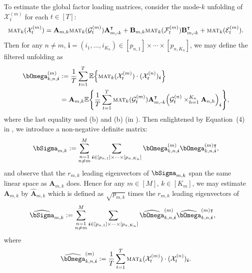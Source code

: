 \documentclass[aos]{imsart}
\theoremstyle{plain}
\theoremstyle{definition}
\def\mat{\textnormal{\textsc{mat}}}
\def\wh#1{\widehat{#1}}
\def\E{\mathbb{E}}
\def\cE{\mathcal{E}}
\def\cF{\mathcal{F}}
\def\cG{\mathcal{G}} \def\cH{\boldsymbol{\mathcal{H}}} \def\cI{\mathcal{I}}
\def\cX{\mathcal{X}}
\def\bi{\boldsymbol{i}}
\def\bA{\mathbf{A}}
\def\bB{\mathbf{B}}
\def\trans{\intercal}
\begin{document}
To estimate the global factor loading matrices, consider the mode-$k$ unfolding of $\cX_t^{(m)}$ for each $t\in[T]$:
\begin{equation}
\label{eqn: unfold_Xt}
\mat_k(\cX_t^{(m)}) = \bA_{m,k} \mat_k(\cG_t^{(m)}) \bA_{m,\text{-}k}^\trans + \bB_{m,k} \mat_k(\cF_t^{(m)}) \bB_{m,\text{-}k}^\trans + \mat_k(\cE_t^{(m)}) .
\end{equation}
Then for any $n\neq m$, $\bi=(i_1,\ldots,i_{K_n}) \in [p_{n,1}] \times \cdots \times[p_{n,K_n}]$, we may define the filtered unfolding as
\begin{align*}
    \bOmega_{k,n,\bi}^{(m)} &:= \frac{1}{T} \sum_{t=1}^T \E\Big\{ \mat_k(\cX_t^{(m)}) \cdot (\cX_t^{(n)})_{\bi} \Big\} \\
    &= \bA_{m,k} \E\Bigg\{ \frac{1}{T} \sum_{t=1}^T \mat_k(\cG_t^{(m)}) \bA_{m,\text{-}k}^\trans \Big( \cG_t^{(n)} \times_{h=1}^{K_n} \bA_{n,h} \Big)_{\bi} \Bigg\} ,
\end{align*}
where the last equality used (b) and (b) (in ). Then enlightened by Equation~(4) in \cite{Lametal2011}, we introduce a non-negative definite matrix:
\begin{equation*}
\begin{split}
    \bSigma_{m,k} := \sum_{\substack{n=1\\ n\neq m}}^M \sum_{\bi \in [p_{n,1}] \times \cdots \times[p_{n,K_n}]} \bOmega_{k,n,\bi}^{(m)} \bOmega_{k,n,\bi}^{(m) \trans} ,
\end{split}
\end{equation*}
and observe that the $r_{m,k}$ leading eigenvectors of $\bSigma_{m,k}$ span the same linear space as $\bA_{m,k}$ does. Hence for any $m\in[M]$, $k\in[K_m]$, we may estimate $\bA_{m,k}$ by $\wh{\bA}_{m,k}$ which is defined as $\sqrt{p_{m,k}}$ times the $r_{m,k}$ leading eigenvectors of
\begin{equation}
\label{eqn: def_hat_Sigma_mk}
\begin{split}
    \wh\bSigma_{m,k} &:= \sum_{\substack{n=1\\ n\neq m}}^M \sum_{\bi \in [p_{n,1}] \times \cdots \times[p_{n,K_n}]} \wh\bOmega_{k,n,\bi}^{(m)} \wh\bOmega_{k,n,\bi}^{(m) \trans} ,
\end{split}
\end{equation}
where
\[
\wh\bOmega_{k,n,\bi}^{(m)} := \frac{1}{T} \sum_{t=1}^T \mat_k(\cX_t^{(m)}) \cdot (\cX_t^{(n)})_{\bi} .
\]
\end{document}
